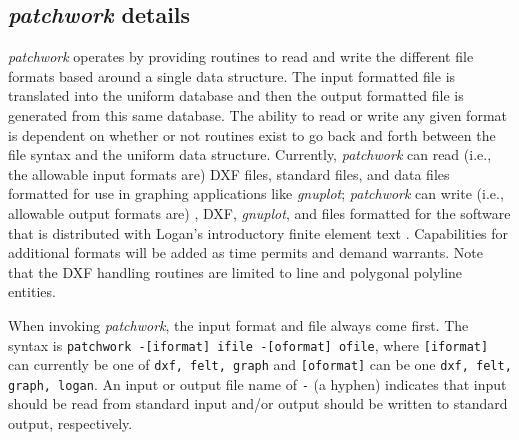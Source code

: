 \subsection{{\em patchwork} details}

{\em patchwork} operates by providing routines to read and write the different
file formats based around a single data structure.  The input formatted file
is translated into the uniform database and then the output formatted file
is generated from this same database.  The ability to read or write
any given format is dependent on whether or not routines exist to go
back and forth between the file syntax and the uniform data structure.
Currently, {\em patchwork} can read (i.e., the allowable input formats are)
DXF files, standard \felt{} files, and data files formatted for use in graphing
applications like {\em gnuplot}; {\em patchwork} can write (i.e.,
allowable output formats are) \felt{}, DXF, {\em gnuplot}, and files formatted 
for the software that is distributed with Logan's introductory finite element 
text \cite{logan:fem}.  Capabilities for additional formats will be added
as time permits and demand warrants.  Note that the DXF handling routines 
are limited to line and polygonal polyline entities.

When invoking {\em patchwork}, the input format and file always come
first.  The syntax is \mbox{{\tt patchwork -[iformat] ifile -[oformat] ofile}},
where {\tt [iformat]} can currently be one of {\tt dxf, felt, graph} and
{\tt [oformat]} can be one {\tt dxf, felt, graph, logan}.  An input
or output file name of {\tt -} (a hyphen) indicates that input should be read
from standard input and/or output should be written to standard output,
respectively.
